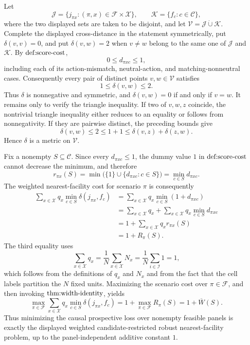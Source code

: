 Let
\[
\mathcal J=\{j_{\pi x}:(\pi,x)\in\mathcal F\times\mathcal X\},
\qquad
\mathcal K=\{f_c:c\in\mathcal C\},
\]
where the two displayed sets are taken to be disjoint, and let \(\mathcal V=\mathcal J\mathbin{\dot\cup}\mathcal K\).  Complete the displayed cross-distance in the statement symmetrically, put \(\delta(v,v)=0\), and put \(\delta(v,w)=2\) when \(v\neq w\) belong to the same one of \(\mathcal J\) and \(\mathcal K\).  By \(\textnormal{def:score-cost}\),
\[
0\leq d_{\pi xc}\leq 1,
\]
including each of its action-mismatch, neutral-action, and matching-nonneutral cases.  Consequently every pair of distinct points \(v,w\in\mathcal V\) satisfies
\[
1\leq\delta(v,w)\leq2.
\]
Thus \(\delta\) is nonnegative and symmetric, and \(\delta(v,w)=0\) if and only if \(v=w\).  It remains only to verify the triangle inequality.  If two of \(v,w,z\) coincide, the nontrivial triangle inequality either reduces to an equality or follows from nonnegativity.  If they are pairwise distinct, the preceding bounds give
\[
\delta(v,w)\leq2\leq1+1\leq\delta(v,z)+\delta(z,w).
\]
Hence \(\delta\) is a metric on \(\mathcal V\).

Fix a nonempty \(S\subseteq\mathcal C\).  Since every \(d_{\pi xc}\leq1\), the dummy value \(1\) in \(\textnormal{def:score-cost}\) cannot decrease the minimum, and therefore
\[
r_{\pi x}(S)
=\min\bigl(\{1\}\cup\{d_{\pi xc}:c\in S\}\bigr)
=\min_{c\in S}d_{\pi xc}.
\]
The weighted nearest-facility cost for scenario \(\pi\) is consequently
\[
\begin{aligned}
\sum_{x\in\mathcal X}q_x\min_{c\in S}
 \delta(j_{\pi x},f_c)
&=\sum_{x\in\mathcal X}q_x\min_{c\in S}(1+d_{\pi xc})\\
&=\sum_{x\in\mathcal X}q_x
  +\sum_{x\in\mathcal X}q_x\min_{c\in S}d_{\pi xc}\\
&=1+\sum_{x\in\mathcal X}q_xr_{\pi x}(S)\\
&=1+R_{\pi}(S).
\end{aligned}
\]
The third equality uses
\[
\sum_{x\in\mathcal X}q_x
=\frac{1}{N}\sum_{x\in\mathcal X}N_x
=\frac{1}{N}\sum_{i\in\mathcal I}1
=1,
\]
which follows from the definitions of \(q_x\) and \(N_x\) and from the fact that the cell labels partition the \(N\) fixed units.  Maximizing the scenario cost over \(\pi\in\mathcal F\), and then invoking \(\textnormal{thm:width-identity}\), yields
\[
\max_{\pi\in\mathcal F}
 \sum_{x\in\mathcal X}q_x\min_{c\in S}\delta(j_{\pi x},f_c)
=1+\max_{\pi\in\mathcal F}R_{\pi}(S)
=1+\overline W(S).
\]
Thus minimizing the causal prospective loss over nonempty feasible panels is exactly the displayed weighted candidate-restricted robust nearest-facility problem, up to the panel-independent additive constant \(1\).

